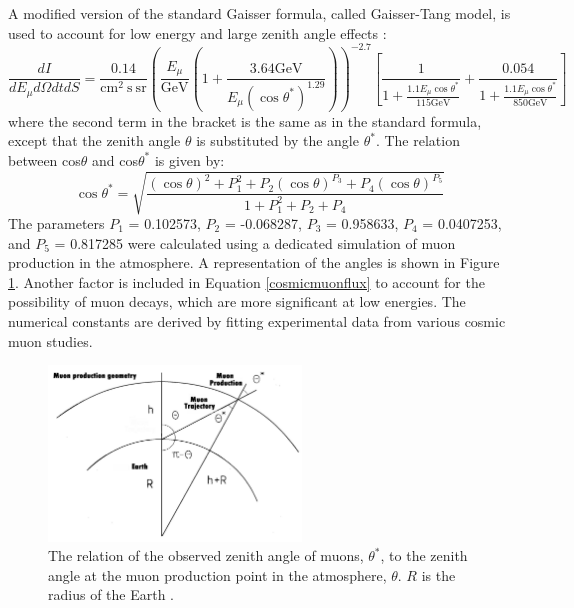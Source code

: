 A modified version of the standard Gaisser formula, called Gaisser-Tang model, is used to account for low energy and large zenith angle effects \cite{guan2015parametrization}:
\begin{equation}\label{cosmicmuonflux}
    \frac{d I}{d E_\mu d \Omega d t d S}=\frac{0.14}{\mathrm{cm}^2 \mathrm{~s} \ \mathrm{sr} }\left( \frac{E_\mu}{\mathrm{GeV}} \left(1+\frac{3.64 \mathrm{GeV}}{E_\mu\left(\cos \theta^*\right)^{1.29}}\right)\right)^{-2.7}\left[\frac{1}{1+\frac{1.1 E_\mu \cos \theta^*}{115 \mathrm{GeV}}}+\frac{0.054}{1+\frac{1.1 E_\mu \cos \theta^*}{850 \mathrm{GeV}}}\right]
\end{equation}
where the second term in the bracket is the same as in the standard formula, except that the zenith angle 
$\theta$ is substituted by the angle $\theta^*$. The relation between cos$\theta$
and cos$\theta^*$ is given by:
\begin{equation}
    \cos \theta^*=\sqrt{\frac{(\cos \theta)^2+P_1^2+P_2(\cos \theta)^{P_3}+P_4(\cos \theta)^{P_5}}{1+P_1^2+P_2+P_4}}
    \end{equation}
The parameters $P_1$ = 0.102573, $P_2$ = -0.068287, $P_3$ = 0.958633, $P_4$ = 0.0407253, and $P_5$ = 0.817285 were calculated using 
a dedicated simulation of muon production in the atmosphere. A representation of the angles is shown in Figure \ref{fig:anglesinmuon}.
Another factor is included in Equation \ref{cosmicmuonflux} to account for the possibility of muon decays, which are more 
significant at low energies. The numerical constants are derived by fitting experimental data from various cosmic muon studies.
\begin{figure}[!h]
    \centering
    \includegraphics[width =0.6\textwidth]{figures/png/Screenshot_20240526_140716.png}
    \caption[The relation of $\theta^*$ to $\theta$.]{The relation of the observed zenith angle of muons, $\theta^*$, to 
    the zenith angle at the muon production point in the atmosphere, $\theta$. 
    $R$ is the radius of the Earth \cite{guan2015parametrization}.}
    \label{fig:anglesinmuon}
\end{figure}

